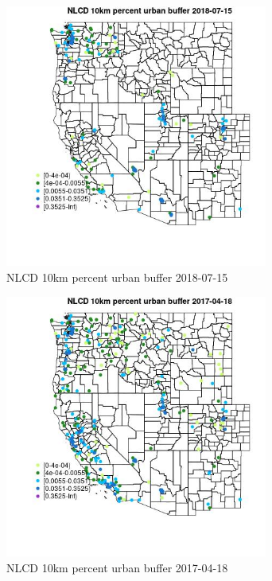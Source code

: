 \begin{figure} 
\centering  
\includegraphics[width=0.77\textwidth]{Code_Outputs/Report_ML_input_PM25_Step4_part_e_de_duplicated_aves_compiled_2019-05-20wNAs_MapObsNLCD_10km_percent_urban_buffer2018-07-15.jpg} 
\caption{\label{fig:Report_ML_input_PM25_Step4_part_e_de_duplicated_aves_compiled_2019-05-20wNAsMapObsNLCD_10km_percent_urban_buffer2018-07-15}NLCD 10km percent urban buffer 2018-07-15} 
\end{figure} 
 

\clearpage 

\begin{figure} 
\centering  
\includegraphics[width=0.77\textwidth]{Code_Outputs/Report_ML_input_PM25_Step4_part_e_de_duplicated_aves_compiled_2019-05-20wNAs_MapObsNLCD_10km_percent_urban_buffer2017-04-18.jpg} 
\caption{\label{fig:Report_ML_input_PM25_Step4_part_e_de_duplicated_aves_compiled_2019-05-20wNAsMapObsNLCD_10km_percent_urban_buffer2017-04-18}NLCD 10km percent urban buffer 2017-04-18} 
\end{figure} 
 

